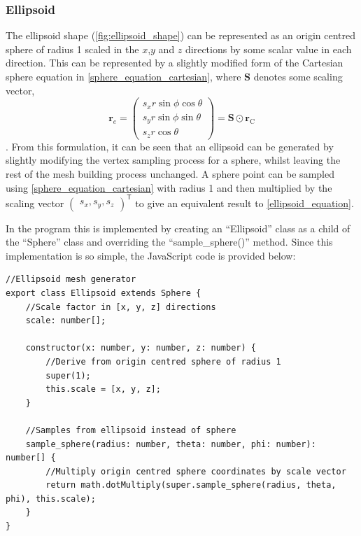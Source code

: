 \subsubsection{Ellipsoid}
The ellipsoid shape (\cref{fig:ellipsoid_shape}) can be represented as an origin centred sphere of radius 1 scaled in the $x$,$y$ and $z$ directions by some scalar value in each direction. This can be represented by a slightly modified form of the Cartesian sphere equation in \cref{sphere_equation_cartesian}, where $\mathbf{S}$ denotes some scaling vector,
\begin{equation}
\mathbf{r}_{e}=\begin{pmatrix}s_x r\sin\phi \cos\theta\\
s_y r\sin\phi \sin\theta\\
s_z r\cos\theta\end{pmatrix}
=\mathbf{S} \odot \mathbf{r}_\mathrm{C}
\label{ellipsoid_equation}
\end{equation}.
From this formulation, it can be seen that an ellipsoid can be generated by slightly modifying the vertex sampling process for a sphere, whilst leaving the rest of the mesh building process unchanged. A sphere point can be sampled using \cref{sphere_equation_cartesian} with radius 1 and then multiplied by the scaling vector $\begin{pmatrix}s_x,s_y,s_z\end{pmatrix}^\mathsf{T}$ to give an equivalent result to \cref{ellipsoid_equation}.

In the program this is implemented by creating an ``Ellipsoid'' class as a child of the ``Sphere'' class and overriding the ``sample\_sphere()'' method. Since this implementation is so simple, the JavaScript code is provided below:

\begin{adjustbox}{width=\textwidth}
\begin{lstlisting}
//Ellipsoid mesh generator
export class Ellipsoid extends Sphere {
    //Scale factor in [x, y, z] directions
    scale: number[];

    constructor(x: number, y: number, z: number) {
        //Derive from origin centred sphere of radius 1
        super(1);
        this.scale = [x, y, z];
    }

    //Samples from ellipsoid instead of sphere
    sample_sphere(radius: number, theta: number, phi: number): number[] {
        //Multiply origin centred sphere coordinates by scale vector
        return math.dotMultiply(super.sample_sphere(radius, theta, phi), this.scale);
    }
}
\end{lstlisting}
\end{adjustbox}

